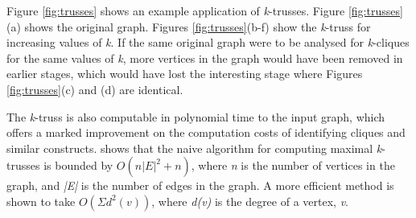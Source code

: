 Figure \ref{fig:trusses} shows an example application of \emph{k}-trusses. Figure \ref{fig:trusses}(a) shows the original graph. Figures \ref{fig:trusses}(b-f) show the \emph{k}-truss for increasing values of \emph{k}. If the same original graph were to be analysed for \emph{k}-cliques for the same values of \emph{k}, more vertices in the graph would have been removed in earlier stages, which would have lost the interesting stage where Figures \ref{fig:trusses}(c) and (d) are identical.

The \emph{k}-truss is also computable in polynomial time to the input graph, which offers a marked improvement on the computation costs of identifying cliques and similar constructs. \cite{trusses} shows that the naive algorithm  for computing maximal \emph{k}-trusses is bounded by $O(n|E|^2 + n)$, where \emph{n} is the number of vertices in the graph, and \emph{|E|} is the number of edges in the graph. A more efficient method is shown to take $O(\Sigma d^2(v))$, where \emph{d(v)} is the degree of a vertex, \emph{v}.
